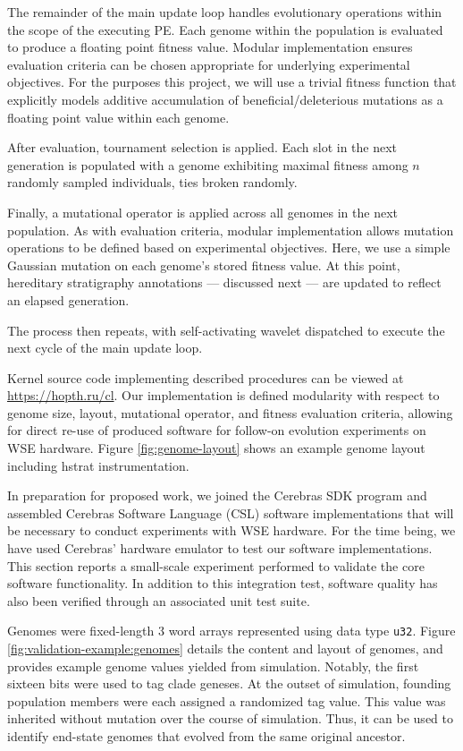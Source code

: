 The remainder of the main update loop handles evolutionary operations within the scope of the executing PE.
Each genome within the population is evaluated to produce a floating point fitness value.
Modular implementation ensures evaluation criteria can be chosen appropriate for underlying experimental objectives.
For the purposes this project, we will use a trivial fitness function that explicitly models additive accumulation of beneficial/deleterious mutations as a floating point value within each genome.

After evaluation, tournament selection is applied.
Each slot in the next generation is populated with a genome exhibiting maximal fitness among $n$ randomly sampled individuals, ties broken randomly.

Finally, a mutational operator is applied across all genomes in the next population.
As with evaluation criteria, modular implementation allows mutation operations to be defined based on experimental objectives.
Here, we use a simple Gaussian mutation on each genome's stored fitness value.
At this point, hereditary stratigraphy annotations --- discussed next --- are updated to reflect an elapsed generation.

The process then repeats, with self-activating wavelet dispatched to execute the next cycle of the main update loop.



Kernel source code implementing described procedures can be viewed at \url{https://hopth.ru/cl}.
Our implementation is defined modularity with respect to genome size, layout, mutational operator, and fitness evaluation criteria, allowing for direct re-use of produced software for follow-on evolution experiments on WSE hardware.
Figure \ref{fig:genome-layout} shows an example genome layout including hstrat instrumentation.


In preparation for proposed work, we joined the Cerebras SDK program \citep{selig2022cerebras} and assembled Cerebras Software Language (CSL) software implementations that will be necessary to conduct experiments with WSE hardware.
For the time being, we have used Cerebras' hardware emulator to test our software implementations.
This section reports a small-scale experiment performed to validate the core software functionality.
In addition to this integration test, software quality has also been verified through an associated unit test suite.

Genomes were fixed-length 3 word arrays represented using data type \texttt{u32}.
Figure \ref{fig:validation-example:genomes} details the content and layout of genomes, and provides example genome values yielded from simulation.
Notably, the first sixteen bits were used to tag clade geneses.
At the outset of simulation, founding population members were each assigned a randomized tag value.
This value was inherited without mutation over the course of simulation.
Thus, it can be used to identify end-state genomes that evolved from the same original ancestor.

